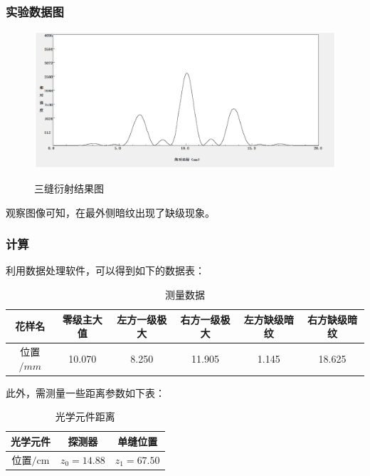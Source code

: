 \documentclass{ctexart}
\begin{document}
\subsubsection{实验数据图}
\begin{figure}[H]
  \centering
  \caption{三缝衍射结果图}
  \includegraphics[width=\textwidth]{3.eps}
  \label{fig:digit}
    
\end{figure}


观察图像可知，在最外侧暗纹出现了缺级现象。


\subsubsection{计算}
利用数据处理软件，可以得到如下的数据表：
\begin{table}[H]
  \centering
  \caption{测量数据}
    \begin{tabular}{|c|c|c|c|c|c|}\hline
    花样名   & {零级主大值} & {左方一级极大} & {右方一级极大} & {左方缺级暗纹} & {右方缺级暗纹} \\\hline
    位置$/\si{mm}$ &10.070 & 8.250 & 11.905 & 1.145 & 18.625 \\\hline
    \end{tabular}%
  \label{tab:addlabel}%
\end{table}%

 此外，需测量一些距离参数如下表：
\begin{table}[htbp]
  \centering
  \caption{光学元件距离}
    \begin{tabular}{|c|c|c|}\hline
    光学元件  & {探测器} & {单缝位置} \\ \hline
    位置$/\si{\centi\meter}$ & $z_0=14.88$ & $z_1=67.50$ \\\hline
    \end{tabular}%
  \label{tab:addlabel}%
\end{table}%
\end{document}
